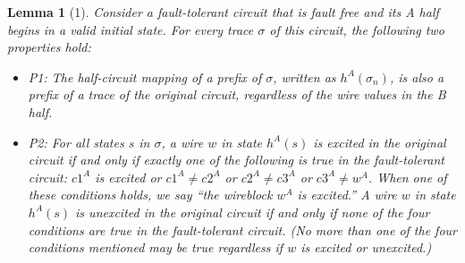 \documentclass[12pt]{report}
\newtheorem*{lemma}{Lemma}
\begin{document}
\begin{lemma}[1]
Consider a fault-tolerant circuit that is fault free and its A half begins in a valid initial state.  For every trace $\sigma$ of this circuit, the following two properties hold: %
\begin{itemize}
\item P1: The half-circuit mapping of a prefix of $\sigma$, written as $h^{A}(\sigma_n)$, is also a prefix of a trace of the original circuit, regardless of the wire values in the B half.
\item P2: For all states $s$ in $\sigma$, a wire $w$ in state $h^A(s)$ is excited in the original circuit if and only if exactly one of the following is true in the fault-tolerant circuit: $c1^A$ is excited or $c1^{A}\neq c2^{A}$ or $c2^{A}\neq c3^A$ or $c3^{A}\neq w^A$.  When one of these conditions holds, we say “the wireblock $w^A$ is excited.”  A wire $w$ in state $h^A(s)$ is unexcited in the original circuit if and only if none of the four conditions are true in the fault-tolerant circuit.  (No more than one of the four conditions mentioned may be true regardless if $w$ is excited or unexcited.) 
\end{itemize}
 



\end{lemma}
\end{document}
